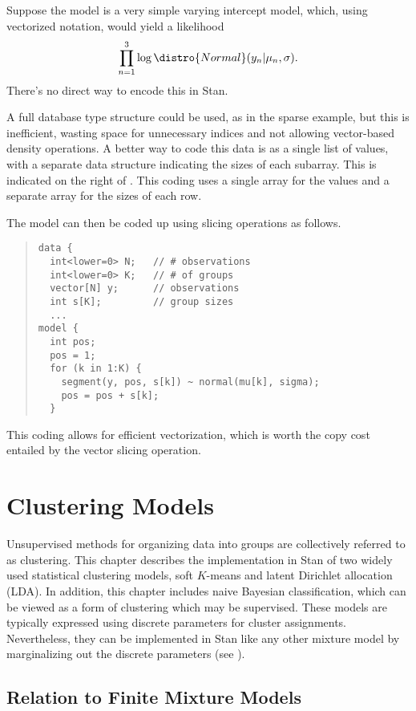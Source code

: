 Suppose the model is a very simple varying intercept model, which,
using vectorized notation, would yield a likelihood
\[
\prod_{n=1}^3 \log \distro{Normal}(y_n | \mu_n, \sigma).
\]
There's no direct way to encode this in Stan.  

A full database type structure could be used, as in the sparse
example, but this is inefficient, wasting space for unnecessary
indices and not allowing vector-based density operations.  A better
way to code this data is as a single list of values, with a separate
data structure indicating the sizes of each subarray.  This is
indicated on the right of .  This coding uses a
single array for the values and a separate array for the sizes of each
row.  

The model can then be coded up using slicing operations as follows.
\begin{quote}
\begin{Verbatim}
data {
  int<lower=0> N;   // # observations
  int<lower=0> K;   // # of groups
  vector[N] y;      // observations
  int s[K];         // group sizes
  ...
model {
  int pos;
  pos = 1;
  for (k in 1:K) {
    segment(y, pos, s[k]) ~ normal(mu[k], sigma);
    pos = pos + s[k];
  }
\end{Verbatim}
\end{quote}
%
This coding allows for efficient vectorization, which is worth the
copy cost entailed by the  vector slicing operation.


\chapter{Clustering Models}\label{clustering.chapter}

\noindent
Unsupervised methods for organizing data into groups are collectively
referred to as clustering.  This chapter describes the implementation
in Stan of two widely used statistical clustering models, soft
$K$-means and latent Dirichlet allocation (LDA).  In addition, this
chapter includes naive Bayesian classification, which can be viewed as
a form of clustering which may be supervised.  These models are
typically expressed using discrete parameters for cluster assignments.
Nevertheless, they can be implemented in Stan like any other mixture
model by marginalizing out the discrete parameters (see
).

\section{Relation to Finite Mixture Models}


